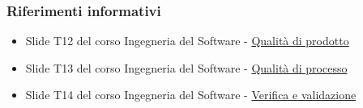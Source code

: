 \subsubsection{Riferimenti informativi}
\begin{itemize}
    \item Slide T12 del corso Ingegneria del Software -  \href{https://www.math.unipd.it/~tullio/IS-1/2021/Dispense/T12.pdf}{Qualità di prodotto}
    \item Slide T13 del corso Ingegneria del Software - \href{https://www.math.unipd.it/~tullio/IS-1/2021/Dispense/T13.pdf}{Qualità di processo}  
    \item Slide T14 del corso Ingegneria del Software - \href{https://www.math.unipd.it/~tullio/IS-1/2021/Dispense/L14.pdf}{Verifica e validazione}
\end{itemize}
\newpage